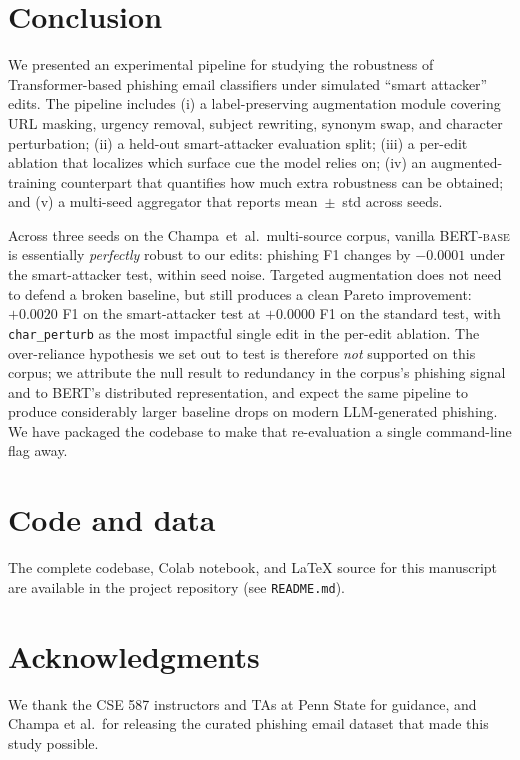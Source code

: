 \documentclass[conference]{IEEEtran}
\begin{document}
\section{Conclusion}
\label{sec:conclusion}

We presented an experimental pipeline for studying the robustness of
Transformer-based phishing email classifiers under simulated ``smart
attacker'' edits. The pipeline includes (i) a label-preserving augmentation
module covering URL masking, urgency removal, subject rewriting, synonym
swap, and character perturbation; (ii) a held-out smart-attacker evaluation
split; (iii) a per-edit ablation that localizes which surface cue the model
relies on; (iv) an augmented-training counterpart that quantifies how much
extra robustness can be obtained; and (v) a multi-seed aggregator that
reports mean~$\pm$~std across seeds.

Across three seeds on the Champa~et~al.\ multi-source corpus, vanilla
\textsc{BERT-base} is essentially \emph{perfectly} robust to our edits:
phishing F1 changes by $-0.0001$ under the smart-attacker test, within
seed noise. Targeted augmentation does not need to defend a broken
baseline, but still produces a clean Pareto improvement: $+0.0020$ F1 on
the smart-attacker test at $+0.0000$ F1 on the standard test, with
\texttt{char\_perturb} as the most impactful single edit in the per-edit
ablation. The over-reliance hypothesis we set out to test is therefore
\emph{not} supported on this corpus; we attribute the null result to
redundancy in the corpus's phishing signal and to BERT's distributed
representation, and expect the same pipeline to produce considerably
larger baseline drops on modern LLM-generated phishing. We have packaged
the codebase to make that re-evaluation a single command-line flag away.

\section*{Code and data}
The complete codebase, Colab notebook, and LaTeX source for this manuscript
are available in the project repository (see \texttt{README.md}).

\section*{Acknowledgments}
We thank the CSE 587 instructors and TAs at Penn State for guidance, and
Champa et al.\ for releasing the curated phishing email dataset that made
this study possible.



\end{document}
